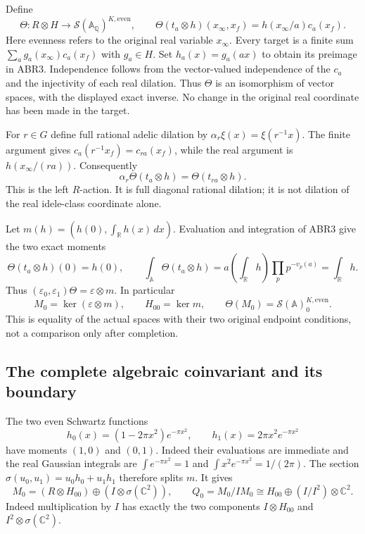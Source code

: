 Define
\begin{equation}\tag{ABR3}
 \Theta:R\otimes H\longrightarrow
           \mathcal S(\mathbb A_{\mathbb Q})^{K,\mathrm{even}},
 \qquad
 \Theta(t_a\otimes h)(x_\infty,x_f)
       =h(x_\infty/a)c_a(x_f).
\end{equation}
Here evenness refers to the original real variable $x_\infty$.
Every target is a finite sum $\sum_a g_a(x_\infty)c_a(x_f)$ with
$g_a\in H$. Set $h_a(x)=g_a(ax)$ to obtain its preimage in ABR3.
Independence follows from the vector-valued independence of the
$c_a$ and the injectivity of each real dilation. Thus $\Theta$ is
an isomorphism of vector spaces, with the displayed exact inverse.
No change in the original real coordinate has been made in the target.

For $r\in G$ define full rational adelic dilation by
$\alpha_r\xi(x)=\xi(r^{-1}x)$. The finite argument gives
$c_a(r^{-1}x_f)=c_{ra}(x_f)$, while the real argument is
$h(x_\infty/(ra))$. Consequently
\begin{equation}\tag{ABR4}
 \alpha_r\Theta(t_a\otimes h)=\Theta(t_{ra}\otimes h).
\end{equation}
This is the left $R$-action. It is full diagonal rational dilation;
it is not dilation of the real idele-class coordinate alone.

Let $m(h)=(h(0),\int_{\mathbb R}h(x)\,dx)$. Evaluation and
integration of ABR3 give the two exact moments
\begin{equation}\tag{ABR5}
 \Theta(t_a\otimes h)(0)=h(0),\qquad
 \int_{\mathbb A}\Theta(t_a\otimes h)
     =a\left(\int_{\mathbb R}h\right)
                     \prod_p p^{-v_p(a)}=\int_{\mathbb R}h.
\end{equation}
Thus $(\varepsilon_0,\varepsilon_1)\Theta=\varepsilon\otimes m$.
In particular
\begin{equation}\tag{ABR6}
 M_0=\ker(\varepsilon\otimes m),\qquad H_{00}=\ker m,
 \qquad
 \Theta(M_0)=\mathcal S(\mathbb A)_0^{K,\mathrm{even}}.
\end{equation}
This is equality of the actual spaces with their two original
endpoint conditions, not a comparison only after completion.

\subsection{The complete algebraic coinvariant and its boundary}

The two even Schwartz functions
\[
 h_0(x)=(1-2\pi x^2)e^{-\pi x^2},\qquad
 h_1(x)=2\pi x^2e^{-\pi x^2}
\]
have moments $(1,0)$ and $(0,1)$. Indeed their evaluations are
immediate and the real Gaussian integrals are
$\int e^{-\pi x^2}=1$ and $\int x^2e^{-\pi x^2}=1/(2\pi)$.
The section $\sigma(u_0,u_1)=u_0h_0+u_1h_1$ therefore splits $m$.
It gives
\begin{equation}\tag{ABR7}
 M_0=(R\otimes H_{00})\oplus(I\otimes\sigma(\mathbb C^2)),
 \qquad
 Q_0=M_0/IM_0\cong H_{00}\oplus(I/I^2)\otimes\mathbb C^2.
\end{equation}
Indeed multiplication by $I$ has exactly the two components
$I\otimes H_{00}$ and $I^2\otimes\sigma(\mathbb C^2)$.

